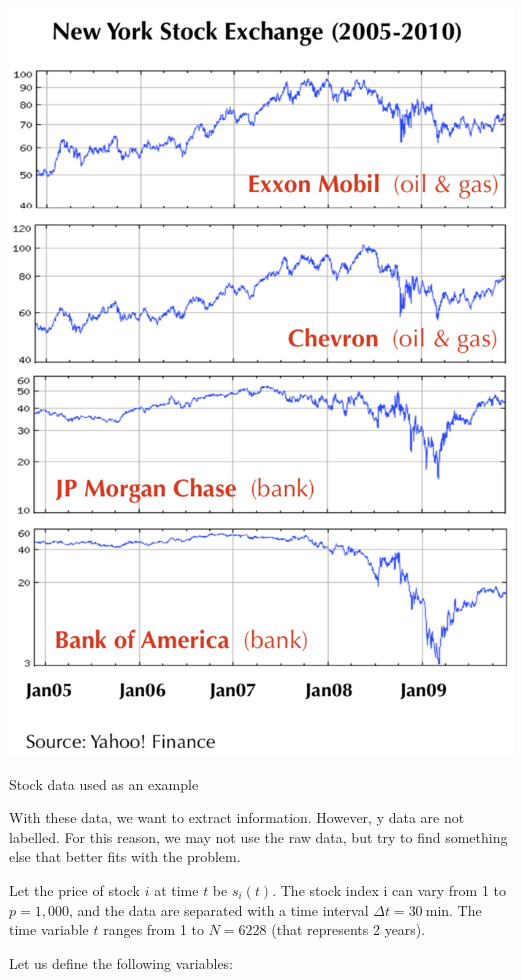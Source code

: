 \begin{marginfigure}
    \includegraphics{./Figures/stock.png}
    \caption{Stock data used as an example}
    \label{financialdata}
\end{marginfigure}

With these data, we want to extract information. However, y data are not
labelled. For this reason, we may not use the raw data, but try to find
something else that better fits with the problem.

Let the price of stock $i$ at time $t$ be $s_i(t)$. The stock index i can vary
from 1 to $p=1,000$, and the data are separated with a time interval 
$\Delta t = \SI{30}{\minute}$. The time variable $t$ ranges from 1 to $N=6228$
(that represents 2 years).

Let us define the following variables:


